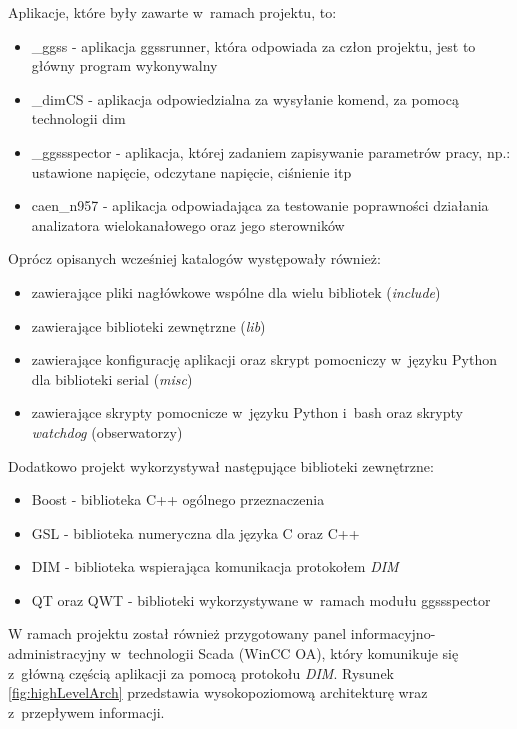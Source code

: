 \par Aplikacje, które były zawarte w~ramach projektu, to:
\begin{itemize}
\item \_ggss - aplikacja ggssrunner, która odpowiada za człon projektu, jest to główny program wykonywalny
\item \_dimCS - aplikacja odpowiedzialna za wysyłanie komend, za pomocą technologii \gls*{dim} \cite{DIMwebsite}
\item \_ggssspector - aplikacja, której zadaniem zapisywanie parametrów pracy, np.: ustawione napięcie, odczytane napięcie, ciśnienie itp
\item caen\_n957 - aplikacja odpowiadająca za testowanie poprawności działania analizatora wielokanałowego oraz jego sterowników
\end{itemize}

\par Oprócz opisanych wcześniej katalogów występowały również:
\begin{itemize}
\item zawierające pliki nagłówkowe wspólne dla wielu bibliotek (\textit{include})
\item zawierające biblioteki zewnętrzne (\textit{lib})
\item zawierające konfigurację aplikacji oraz skrypt pomocniczy w~języku Python dla biblioteki serial (\textit{misc})
\item zawierające skrypty pomocnicze w~języku Python i~\gls*{bash} oraz skrypty \textit{watchdog} (obserwatorzy)
\end{itemize}

\par Dodatkowo projekt wykorzystywał następujące biblioteki zewnętrzne:
\begin{itemize}
\item Boost - biblioteka C++ ogólnego przeznaczenia
\item GSL - biblioteka numeryczna dla języka C oraz C++
\item DIM - biblioteka wspierająca komunikacja protokołem \textit{DIM}
\item QT oraz QWT - biblioteki wykorzystywane w~ramach modułu ggssspector
\end{itemize}
W ramach projektu został również przygotowany panel informacyjno-administracyjny w~technologii Scada (WinCC OA), który komunikuje się z~główną częścią aplikacji za pomocą protokołu \textit{DIM}. Rysunek \ref{fig:highLevelArch} przedstawia wysokopoziomową architekturę wraz z~przepływem informacji.

